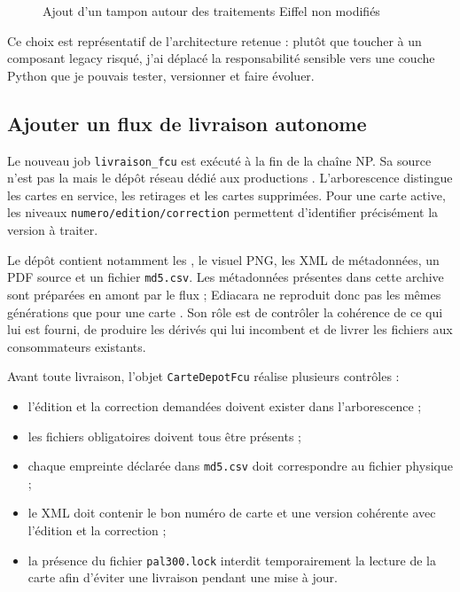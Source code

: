 \begin{figure}[H]
\centering
{}
\caption{Ajout d'un tampon autour des traitements Eiffel non modifiés}
\label{fig:tampon-eiffel}
\end{figure}

Ce choix est représentatif de l'architecture retenue : plutôt que toucher à un composant legacy risqué, j'ai déplacé la responsabilité sensible vers une couche Python que je pouvais tester, versionner et faire évoluer.

\subsection{Ajouter un flux de livraison  autonome}

Le nouveau job \texttt{livraison\_fcu} est exécuté à la fin de la chaîne NP. Sa source n'est pas la  mais le dépôt réseau dédié aux productions . L'arborescence distingue les cartes en service, les retirages et les cartes supprimées. Pour une carte active, les niveaux \texttt{numero/edition/correction} permettent d'identifier précisément la version à traiter.

Le dépôt contient notamment les , le visuel PNG, les XML de métadonnées, un PDF source et un fichier \texttt{md5.csv}. Les métadonnées présentes dans cette archive sont préparées en amont par le flux  ; Ediacara ne reproduit donc pas les mêmes générations que pour une carte . Son rôle est de contrôler la cohérence de ce qui lui est fourni, de produire les dérivés qui lui incombent et de livrer les fichiers aux consommateurs existants.

Avant toute livraison, l'objet \texttt{CarteDepotFcu} réalise plusieurs contrôles :

\begin{itemize}
    \item l'édition et la correction demandées doivent exister dans l'arborescence ;
    \item les fichiers obligatoires doivent tous être présents ;
    \item chaque empreinte déclarée dans \texttt{md5.csv} doit correspondre au fichier physique ;
    \item le XML doit contenir le bon numéro de carte et une version cohérente avec l'édition et la correction ;
    \item la présence du fichier \texttt{pal300.lock} interdit temporairement la lecture de la carte afin d'éviter une livraison pendant une mise à jour.
\end{itemize}

